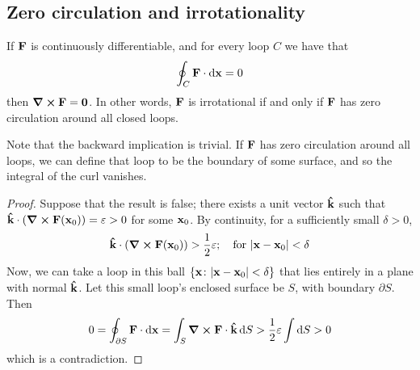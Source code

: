 \subsection{Zero circulation and irrotationality}
\begin{proposition}
	If \(\vb F\) is continuously differentiable, and for every loop \(C\) we have that
	\[
		\oint_C \vb F \cdot \dd{\vb x} = 0
	\]
	then \(\curl{\vb F} = \vb 0\).
	In other words, \(\vb F\) is irrotational if and only if \(\vb F\) has zero circulation around all closed loops.
\end{proposition}
\noindent Note that the backward implication is trivial.
If \(\vb F\) has zero circulation around all loops, we can define that loop to be the boundary of some surface, and so the integral of the curl vanishes.
\begin{proof}
	Suppose that the result is false; there exists a unit vector \(\vu{k}\) such that \(\vu{k} \cdot \left( \curl{\vb F(\vb x_0)} \right) = \varepsilon > 0\) for some \(\vb x_0\).
	By continuity, for a sufficiently small \(\delta > 0\),
	\[
		\vu{k} \cdot \left( \curl{\vb F(\vb x_0)} \right) > \frac{1}{2}\varepsilon;\quad \text{for }\abs{\vb x - \vb x_0} < \delta
	\]
	Now, we can take a loop in this ball \(\{ \vb x \colon \abs{\vb x - \vb x_0} < \delta \}\) that lies entirely in a plane with normal \(\vu{k}\).
	Let this small loop's enclosed surface be \(S\), with boundary \(\partial S\).
	Then
	\[
		0 = \oint_{\partial S} \vb F \cdot \dd{\vb x} = \int_S \curl{\vb F} \cdot \vu k \dd{S} > \frac{1}{2}\varepsilon \int \dd{S} > 0
	\]
	which is a contradiction.
\end{proof}

